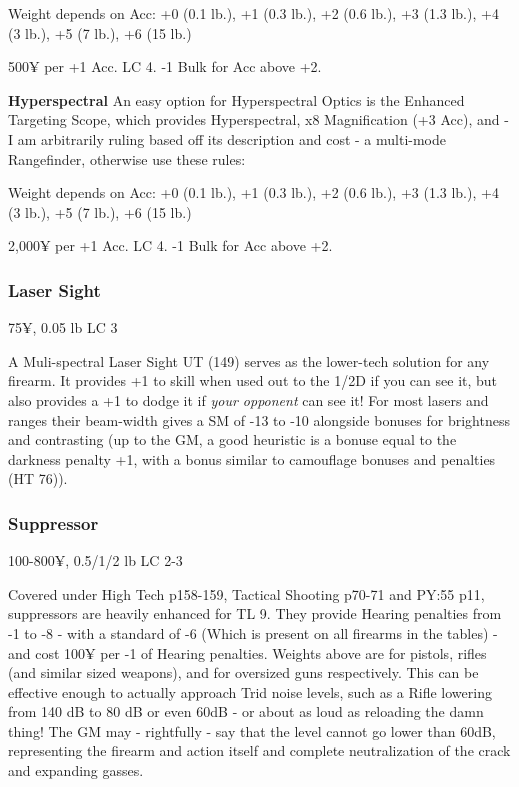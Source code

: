 Weight depends on Acc: +0 (0.1 lb.), +1 (0.3 lb.), +2 (0.6 lb.), +3 (1.3 lb.), +4 (3 lb.), +5 (7 lb.), +6 (15 lb.)

500¥ per +1 Acc. LC 4. -1 Bulk for Acc above +2.

\textbf{Hyperspectral}
An easy option for Hyperspectral Optics is the Enhanced Targeting Scope, which provides Hyperspectral, x8 Magnification (+3 Acc), and - I am arbitrarily ruling based off its description and cost - a multi-mode Rangefinder, otherwise use these rules:

Weight depends on Acc: +0 (0.1 lb.), +1 (0.3 lb.), +2 (0.6 lb.), +3 (1.3 lb.), +4 (3 lb.), +5 (7 lb.), +6 (15 lb.)

2,000¥ per +1 Acc. LC 4. -1 Bulk for Acc above +2.

\subsubsection{Laser Sight}\label{laser_sight}
75¥, 0.05 lb LC 3

A Muli-spectral Laser Sight UT (149) serves as the lower-tech solution for any firearm. It provides +1 to skill when used out to the 1/2D if you can see it, but also provides a +1 to dodge it if \textit{your opponent} can see it! For most lasers and ranges their beam-width gives a SM of -13 to -10 alongside bonuses for brightness and contrasting (up to the GM, a good heuristic is a bonuse equal to the darkness penalty +1, with a bonus similar to camouflage bonuses and penalties (HT 76)).

\subsubsection{Suppressor}
100-800¥, 0.5/1/2 lb LC 2-3

Covered under High Tech p158-159, Tactical Shooting p70-71 and PY:55 p11, suppressors are heavily enhanced for TL 9. They provide Hearing penalties from -1 to -8 - with a standard of -6 (Which is present on all firearms in the tables) - and cost 100¥ per -1 of Hearing penalties. Weights above are for pistols, rifles (and similar sized weapons), and for oversized guns respectively. This can be effective enough to actually approach Trid noise levels, such as a Rifle lowering from 140 dB to 80 dB or even 60dB - or about as loud as reloading the damn thing! The GM may - rightfully - say that the level cannot go lower than 60dB, representing the firearm and action itself and complete neutralization of the crack and expanding gasses.

